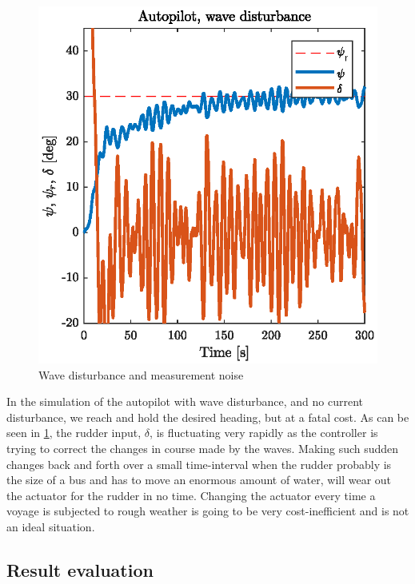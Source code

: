\begin{figure}[h]
	\centering
	\includegraphics[width=\textwidth]{figures/p5p3d.eps}
	\caption{Wave disturbance and measurement noise}
\label{fig:p5p3d_wave_distur}
\end{figure}

In the simulation of the autopilot with wave disturbance, and no current disturbance, we reach and hold the desired heading, but at a fatal cost. As can be seen in \cref{fig:p5p3d_wave_distur}, the rudder input, $\delta$, is fluctuating very rapidly as the controller is trying to correct the changes in course made by the waves. Making such sudden changes back and forth over a small time-interval when the rudder probably is the size of a bus and has to move an enormous amount of water, will wear out the actuator for the rudder in no time. Changing the actuator every time a voyage is subjected to rough weather is going to be very cost-inefficient and is not an ideal situation.



\subsection{Result evaluation} \label{sec:Autopilot_eval}

